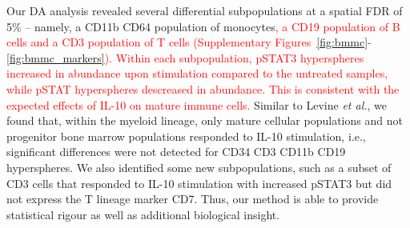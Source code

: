 \documentclass{article}
\newcommand\revised[1]{\textcolor{red}{#1}}
\begin{document}
Our DA analysis revealed several differential subpopulations at a spatial FDR of 5\% -- namely, a CD11b\hi{} CD64\hi{} population of monocytes\revised{, a CD19\hi{} population of B cells and a CD3\hi{} population of T cells (Supplementary Figures~\ref{fig:bmmc}-\ref{fig:bmmc_markers}).
Within each subpopulation, pSTAT3\hi{} hyperspheres increased in abundance upon stimulation compared to the untreated samples, while pSTAT\lo{} hyperspheres descreased in abundance.
This is consistent with the expected effects of IL-10 on mature immune cells.}
Similar to Levine \textit{et al.}, we found that, within the myeloid lineage, only mature cellular populations and not progenitor bone marrow populations responded to IL-10 stimulation, i.e., significant differences were not detected for CD34\hi{} CD3\lo{} CD11b\lo{} CD19\lo{} hyperspheres.
We also identified some new subpopulations, such as a subset of CD3\hi{} cells that responded to IL-10 stimulation with increased pSTAT3 but did not express the T lineage marker CD7.
Thus, our method is able to provide statistical rigour as well as additional biological insight.
\end{document}
